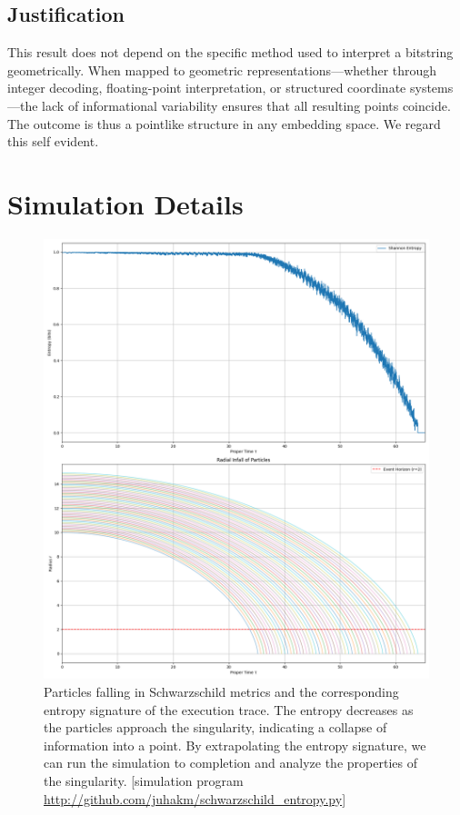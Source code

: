\documentclass[11pt]{article}
\begin{document}
\subsection*{Justification}

This result does not depend on the specific method used to interpret a bitstring geometrically. When mapped to geometric representations---whether through integer decoding, floating-point interpretation, or structured coordinate systems---the lack of informational variability ensures that all resulting points coincide. The outcome is thus a pointlike structure in any embedding space. We regard this self evident.



\section{Simulation Details}

\begin{figure}[h!]
  \centering
  \includegraphics[width=1.0\textwidth]{figures/schwarzschild_entropy_signature.png}
  \caption{Particles falling in Schwarzschild metrics and the corresponding entropy signature of the execution trace. The entropy decreases as the particles approach the singularity, indicating a collapse of information into a point. By extrapolating the entropy signature, we can run the simulation to completion and analyze the properties of the singularity.
      [simulation program \url{http://github.com/juhakm/schwarzschild_entropy.py}]}
  \label{fig:vanishing_entropy}
\end{figure}
\end{document}
